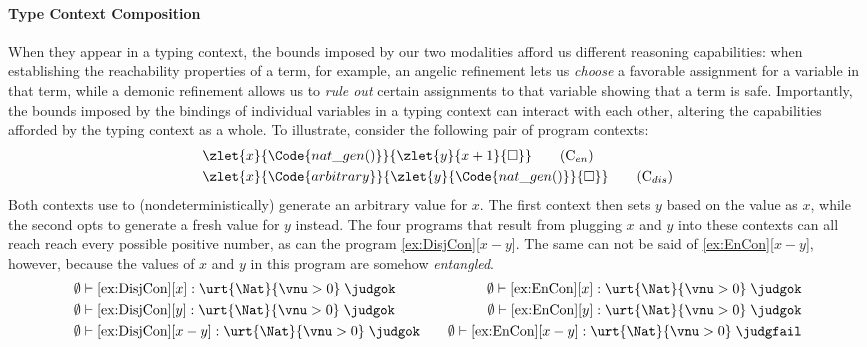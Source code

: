 \paragraph{Type Context Composition}
When they appear in a typing context, the bounds imposed by our two
modalities afford us different reasoning capabilities: when
establishing the reachability properties of a term, for example, an
angelic refinement lets us \emph{choose} a favorable assignment for a
variable in that term, while a demonic refinement allows us to
\emph{rule out} certain assignments to that variable showing that a
term is safe.
Importantly, the bounds imposed by the bindings of individual
variables in a typing context can interact with each other, altering
the capabilities afforded by the typing context as a whole. To
illustrate, consider the following pair of program contexts:
\begin{align}
  &\zlet{x}{\Code{nat\_gen () }}{\zlet{y}{x + 1}{\square}}
    \tag{C$_{en}$}\label{ex:EnCon} \\
  &\zlet{x}{\Code{arbitrary}}{\zlet{y}{\Code{nat\_gen()}}{\square}}
    \tag{C$_{dis}$}\label{ex:DisjCon}
\end{align}\noindent
Both contexts use  to (nondeterministically) generate
an arbitrary value for $x$. The first context then sets $y$ based on
the value as $x$, while the second opts to generate a fresh value for
$y$ instead. The four programs that result from plugging $x$ and $y$
into these contexts can all reach reach every possible positive
number, as can the program \ref{ex:DisjCon}[$x - y$].  The same can
not be said of \ref{ex:EnCon}[$x - y$], however, because the values of
$x$ and $y$ in this program are somehow \emph{entangled}.
\begin{align*}
  &\emptyset \vdash \text{\ref{ex:DisjCon}}[x] : \urt{\Nat}{\vnu > 0}
    \;\judgok \quad
  &\emptyset \vdash \text{\ref{ex:EnCon}}[x] : \urt{\Nat}{\vnu > 0}
    \;\judgok  \\
  & \emptyset \vdash \text{\ref{ex:DisjCon}}[y] : \urt{\Nat}{\vnu > 0}
  \;\judgok \quad
  &\emptyset \vdash \text{\ref{ex:EnCon}}[y] : \urt{\Nat}{\vnu > 0}
    \;\judgok \\
  & \emptyset \vdash \text{\ref{ex:DisjCon}}[x - y] : \urt{\Nat}{\vnu
    > 0} \;\judgok \quad & \emptyset \vdash \text{\ref{ex:EnCon}}[x - y] : \urt{\Nat}{\vnu > 0} \;\judgfail
\end{align*}\noindent
